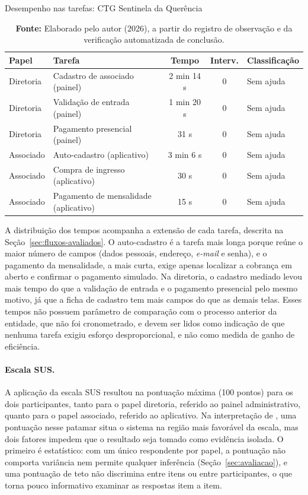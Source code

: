 \documentclass[12pt,a4paper]{article}
\begin{document}
\begin{table}[H]
  \centering
  \caption{Desempenho nas tarefas: CTG Sentinela da Querência}
  \label{tab:ctg-tarefas}
  \begin{tabular}{@{}L{2.2cm}L{5.4cm}ccL{2.2cm}@{}}
    \toprule
    \textbf{Papel} & \textbf{Tarefa} & \textbf{Tempo} & \textbf{Interv.} & \textbf{Classificação} \\
    \midrule
    Diretoria & Cadastro de associado (painel)            & 2 min 14 s & 0 & Sem ajuda \\
    Diretoria & Validação de entrada (painel)             & 1 min 20 s & 0 & Sem ajuda \\
    Diretoria & Pagamento presencial (painel)             & 31 s       & 0 & Sem ajuda \\
    Associado & Auto-cadastro (aplicativo)                & 3 min 6 s  & 0 & Sem ajuda \\
    Associado & Compra de ingresso (aplicativo)           & 30 s       & 0 & Sem ajuda \\
    Associado & Pagamento de mensalidade (aplicativo)     & 15 s       & 0 & Sem ajuda \\
    \bottomrule
  \end{tabular}
  \caption*{\textbf{Fonte:} Elaborado pelo autor (2026), a partir do registro de observação e da
  verificação automatizada de conclusão.}
\end{table}

A distribuição dos tempos acompanha a extensão de cada tarefa, descrita na
Seção~\ref{sec:fluxos-avaliados}. O auto-cadastro é a tarefa mais longa porque reúne o maior número de
campos (dados pessoais, endereço, \textit{e-mail} e senha), e o pagamento da mensalidade, a mais
curta, exige apenas localizar a cobrança em aberto e confirmar o pagamento simulado. Na diretoria, o
cadastro mediado levou mais tempo do que a validação de entrada e o pagamento presencial pelo mesmo
motivo, já que a ficha de cadastro tem mais campos do que as demais telas. Esses tempos não possuem
parâmetro de comparação com o processo anterior da entidade, que não foi cronometrado, e devem ser
lidos como indicação de que nenhuma tarefa exigiu esforço desproporcional, e não como medida de ganho
de eficiência.

\paragraph{Escala SUS.} A aplicação da escala SUS resultou na pontuação máxima (100 pontos) para os
dois participantes, tanto para o papel diretoria, referido ao painel administrativo, quanto para o
papel associado, referido ao aplicativo. Na interpretação de \textcite{bangor2009}, uma pontuação
nesse patamar situa o sistema na região mais favorável da escala, mas dois fatores impedem que o
resultado seja tomado como evidência isolada. O primeiro é estatístico: com um único respondente por
papel, a pontuação não comporta variância nem permite qualquer inferência (Seção~\ref{sec:avaliacao}),
e uma pontuação de teto não discrimina entre itens ou entre participantes, o que torna pouco
informativo examinar as respostas item a item.
\end{document}

